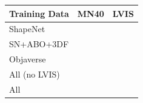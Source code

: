 \setlength{\tabcolsep}{2pt}
\footnotesize
    \begin{tabular}{l|rr}
    \toprule
    Training Data & \multicolumn{1}{l}{MN40} & \multicolumn{1}{l}{LVIS} \\
    \midrule
    ShapeNet &       &  \\
    SN+ABO+3DF &       &  \\
    Objaverse &       &  \\
    All (no LVIS) &       &  \\
    All &       &  \\
    \bottomrule
    \end{tabular}%
  \label{tab:addlabel}%


